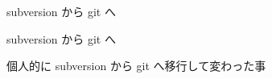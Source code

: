 % 
% 
% 
% 

\begin{frame}{}{}
  subversion から git へ
\end{frame}


\begin{frame}[t]{subversion から git へ}{}

  個人的に subversion から git へ移行して変わった事
\end{frame}


